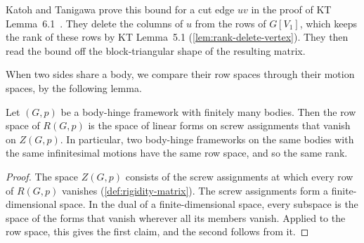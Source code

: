 Katoh and Tanigawa prove this bound for a cut edge $uv$ in the proof of
KT Lemma~6.1~\cite[p.~672]{katohTanigawa2011}. They delete the columns
of $u$ from the rows of $G[V_1]$, which keeps the rank of these rows by
KT Lemma~5.1 (\cref{lem:rank-delete-vertex}). They then read the bound
off the block-triangular shape of the resulting matrix.

When two sides share a body, we compare their row spaces through their
motion spaces, by the following lemma.

\begin{lemma}
  \label{lem:span-rigidityRows-eq-of-motions-eq}
  \leanok
  Let $(G,p)$ be a body-hinge framework with finitely many bodies. Then
  the row space of $R(G,p)$ is the space of linear forms on screw
  assignments that vanish on $Z(G,p)$. In particular, two body-hinge
  frameworks on the same bodies with the same infinitesimal motions have
  the same row space, and so the same rank.
\end{lemma}
\begin{proof}
  \leanok
  The space $Z(G,p)$ consists of the screw assignments at which every
  row of $R(G,p)$ vanishes (\cref{def:rigidity-matrix}). The screw
  assignments form a finite-dimensional space. In the dual of a
  finite-dimensional space, every subspace is the space of the forms
  that vanish wherever all its members vanish. Applied to the row space,
  this gives the first claim, and the second follows from it.
\end{proof}

